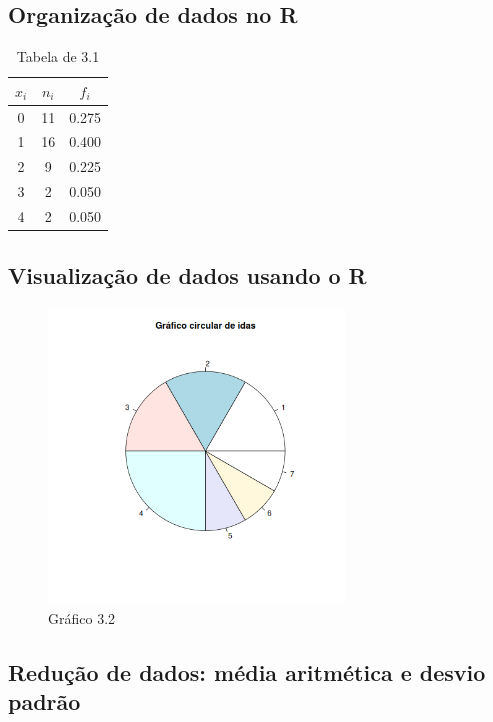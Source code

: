 \documentclass[11pt,a4paper]{article}
\begin{document}
\subsection{Organização de dados no R}

\begin{table}[h!]
	\centering
	\begin{tabular}{|c|c|c|}
		\hline
		$x_i$&$n_i$&$f_i$ \\
		\hline
		0&11&0.275\\
		\hline
		1&16&0.400\\
		\hline
		2& 9&0.225\\
		\hline
		3& 2&0.050\\
		\hline
		4& 2&0.050\\
		\hline
	\end{tabular}
	\caption{Tabela de 3.1}
\end{table}


\subsection{Visualização de dados usando o R}

\begin{figure}[h!]
	\centering
	\includegraphics[width=0.7\textwidth]{./recursos/ex3_2.png}
	\caption{Gráfico 3.2}
\end{figure}
\clearpage


\subsection{Redução de dados: média aritmética e desvio padrão}
\end{document}
